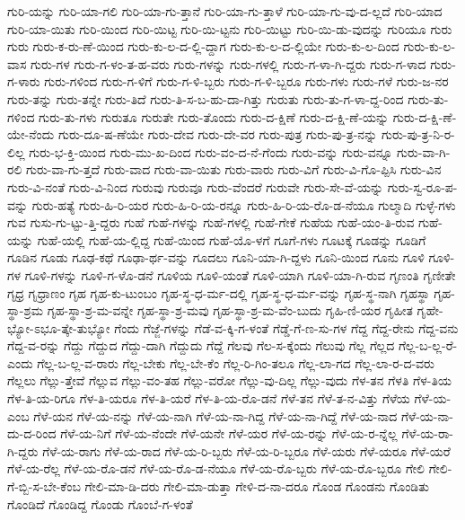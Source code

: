 {ಗುರಿ-ಯನ್ನು
ಗುರಿ-ಯಾ-ಗಲಿ
ಗುರಿ-ಯಾ-ಗು-ತ್ತಾನೆ
ಗುರಿ-ಯಾ-ಗು-ತ್ತಾಳೆ
ಗುರಿ-ಯಾ-ಗು-ವು-ದ-ಲ್ಲದೆ
ಗುರಿ-ಯಾದ
ಗುರಿ-ಯಾ-ಯಿತು
ಗುರಿ-ಯಿಂದ
ಗುರಿ-ಯಿಟ್ಟ
ಗುರಿ-ಯಿ-ಟ್ಟನು
ಗುರಿ-ಯಿಟ್ಟು
ಗುರಿ-ಯಿ-ಡು-ವುದನ್ನು
ಗುರಿಯೂ
ಗುರು
ಗುರು
ಗುರು-ಕ-ರು-ಣೆ-ಯಿಂದ
ಗುರು-ಕು-ಲ-ದ-ಲ್ಲಿ-ದ್ದಾಗ
ಗುರು-ಕು-ಲ-ದ-ಲ್ಲಿಯೇ
ಗುರು-ಕು-ಲ-ದಿಂದ
ಗುರು-ಕು-ಲ-ವಾಸ
ಗುರು-ಗಳ
ಗುರು-ಗ-ಳಂ-ತ-ಹ-ವರು
ಗುರು-ಗಳನ್ನು
ಗುರು-ಗಳಲ್ಲಿ
ಗುರು-ಗ-ಳಾ-ಗಿ-ದ್ದರು
ಗುರು-ಗ-ಳಾದ
ಗುರು-ಗ-ಳಾರು
ಗುರು-ಗಳಿಂದ
ಗುರು-ಗ-ಳಿಗೆ
ಗುರು-ಗ-ಳಿ-ಬ್ಬರು
ಗುರು-ಗ-ಳಿ-ಬ್ಬರೂ
ಗುರು-ಗಳು
ಗುರು-ಗಳೆ
ಗುರು-ಜ-ನರ
ಗುರು-ತನ್ನು
ಗುರು-ತನ್ನೇ
ಗುರು-ತಿದೆ
ಗುರು-ತಿ-ಸ-ಬ-ಹು-ದಾ-ಗಿತ್ತು
ಗುರುತು
ಗುರು-ತು-ಗ-ಳಾ-ದ್ದ-ರಿಂದ
ಗುರು-ತು-ಗಳಿಂದ
ಗುರು-ತು-ಗಳು
ಗುರುತೂ
ಗುರುತೇ
ಗುರು-ತೊಂದು
ಗುರು-ದ-ಕ್ಷಿಣೆ
ಗುರು-ದ-ಕ್ಷಿ-ಣೆ-ಯನ್ನು
ಗುರು-ದ-ಕ್ಷಿ-ಣೆ-ಯೇ-ನೆಂದು
ಗುರು-ದೂ-ಷ-ಣೆಯೇ
ಗುರು-ದೇವ
ಗುರು-ದೇ-ವರ
ಗುರು-ಪುತ್ರ
ಗುರು-ಪು-ತ್ರ-ನನ್ನು
ಗುರು-ಪು-ತ್ರ-ನಿ-ರ-ಲಿಲ್ಲ
ಗುರು-ಭ-ಕ್ತಿ-ಯಿಂದ
ಗುರು-ಮು-ಖ-ದಿಂದ
ಗುರು-ವಂ-ದ-ನೆ-ಗೆಂದು
ಗುರು-ವನ್ನು
ಗುರು-ವನ್ನೂ
ಗುರು-ವಾ-ಗಿ-ರಲಿ
ಗುರು-ವಾ-ಗು-ತ್ತದೆ
ಗುರು-ವಾದ
ಗುರು-ವಾ-ಯಿತು
ಗುರು-ವಾರು
ಗುರು-ವಿಗೆ
ಗುರು-ವಿ-ಗೊ-ಪ್ಪಿಸಿ
ಗುರು-ವಿನ
ಗುರು-ವಿ-ನಂತೆ
ಗುರು-ವಿ-ನಿಂದ
ಗುರುವು
ಗುರುವೂ
ಗುರು-ವೆಂದರೆ
ಗುರುವೇ
ಗುರು-ಸೇ-ವೆ-ಯನ್ನು
ಗುರು-ಸ್ವ-ರೂ-ಪ-ವನ್ನು
ಗುರು-ಹತ್ಯೆ
ಗುರು-ಹಿ-ರಿ-ಯರ
ಗುರು-ಹಿ-ರಿ-ಯ-ರನ್ನೂ
ಗುರು-ಹಿ-ರಿ-ಯ-ರೊ-ಡ-ನೆಯೂ
ಗುಲ್ಮಾದಿ
ಗುಳ್ಳೆ-ಗಳು
ಗುವ
ಗುಸು-ಗು-ಟ್ಟು-ತ್ತಿ-ದ್ದರು
ಗುಹೆ
ಗುಹೆ-ಗಳನ್ನು
ಗುಹೆ-ಗಳಲ್ಲಿ
ಗುಹೆ-ಗೇಕೆ
ಗುಹೆಯ
ಗುಹೆ-ಯಂ-ತಿ-ರುವ
ಗುಹೆ-ಯನ್ನು
ಗುಹೆ-ಯಲ್ಲಿ
ಗುಹೆ-ಯ-ಲ್ಲಿದ್ದ
ಗುಹೆ-ಯಿಂದ
ಗುಹೆ-ಯೊ-ಳಗೆ
ಗೂಗೆ-ಗಳು
ಗೂಟಕ್ಕೆ
ಗೂಡನ್ನು
ಗೂಡಿಗೆ
ಗೂಡಿನ
ಗೂಡು
ಗೂಢ-ಕಥೆ
ಗೂಢಾ-ರ್ಥ-ವನ್ನು
ಗೂದಲು
ಗೂನಿ-ಯಾ-ಗಿ-ದ್ದಳು
ಗೂನಿ-ಯಿಂದ
ಗೂನು
ಗೂಳಿ
ಗೂಳಿ-ಗಳ
ಗೂಳಿ-ಗಳನ್ನು
ಗೂಳಿ-ಗ-ಳೊ-ಡನೆ
ಗೂಳಿಯ
ಗೂಳಿ-ಯಂತೆ
ಗೂಳಿ-ಯಾಗಿ
ಗೂಳಿ-ಯಾ-ಗಿ-ರುವ
ಗೃಣಂತಿ
ಗೃಣೀತೇ
ಗೃಧ್ರ
ಗೃಧ್ರಾಣಂ
ಗೃಹ
ಗೃಹ-ಕು-ಟುಂಬಂ
ಗೃಹ-ಸ್ಥ-ಧ-ರ್ಮ-ದಲ್ಲಿ
ಗೃಹ-ಸ್ಥ-ಧ-ರ್ಮ-ವನ್ನು
ಗೃಹ-ಸ್ಥ-ನಾಗಿ
ಗೃಹಸ್ಥಾ
ಗೃಹ-ಸ್ಥಾ-ಶ್ರಮ
ಗೃಹ-ಸ್ಥಾ-ಶ್ರ-ಮ-ವನ್ನೇ
ಗೃಹ-ಸ್ಥಾ-ಶ್ರ-ಮವು
ಗೃಹ-ಸ್ಥಾ-ಶ್ರ-ಮ-ವೆಂ-ಬುದು
ಗೃಹಿ-ಣಿ-ಯರ
ಗೃಹೀತ
ಗೃಹೇ-ಭ್ಯೋ-ಽಭೂ-ತ್ಕೇ-ತುಭ್ಯೋ
ಗೆಂದು
ಗೆಜ್ಜೆ-ಗಳನ್ನು
ಗೆಡೆ-ವ-ಕ್ಕಿ-ಗ-ಳಂತೆ
ಗೆಡ್ಡೆ-ಗೆ-ಣ-ಸು-ಗಳ
ಗೆದ್ದ
ಗೆದ್ದ-ರೇನು
ಗೆದ್ದ-ವನು
ಗೆದ್ದ-ವ-ರನ್ನು
ಗೆದ್ದು
ಗೆದ್ದುದ
ಗೆದ್ದು-ದಾಗಿ
ಗೆದ್ದುದು
ಗೆದ್ದೆ
ಗೆಲವು
ಗೆಲ-ಸ-ಕ್ಕೆಂದು
ಗೆಲುವು
ಗೆಲ್ಲ
ಗೆಲ್ಲದ
ಗೆಲ್ಲ-ಬ-ಲ್ಲ-ರೆ-ಎಂದು
ಗೆಲ್ಲ-ಬ-ಲ್ಲ-ವ-ರಾರು
ಗೆಲ್ಲ-ಬೇಕು
ಗೆಲ್ಲ-ಬೇ-ಕೆಂ
ಗೆಲ್ಲ-ರಿ-ಗಿಂ-ತಲೂ
ಗೆಲ್ಲ-ಲಾ-ಗದ
ಗೆಲ್ಲ-ಲಾ-ರ-ದ-ವರು
ಗೆಲ್ಲಲು
ಗೆಲ್ಲು-ತ್ತೇವೆ
ಗೆಲ್ಲುವ
ಗೆಲ್ಲು-ವಂ-ತಹ
ಗೆಲ್ಲು-ವರೋ
ಗೆಲ್ಲು-ವು-ದಿಲ್ಲ
ಗೆಲ್ಲು-ವುದು
ಗೆಳ-ತನ
ಗೆಳತಿ
ಗೆಳ-ತಿಯ
ಗೆಳ-ತಿ-ಯ-ರಿಗೂ
ಗೆಳ-ತಿ-ಯರೂ
ಗೆಳ-ತಿ-ಯರೆ
ಗೆಳ-ತಿ-ಯ-ರೊ-ಡನೆ
ಗೆಳೆ-ತನ
ಗೆಳೆ-ತ-ನ-ವಿತ್ತು
ಗೆಳೆಯ
ಗೆಳೆ-ಯ-ಎಂಬ
ಗೆಳೆ-ಯನ
ಗೆಳೆ-ಯ-ನನ್ನು
ಗೆಳೆ-ಯ-ನಾಗಿ
ಗೆಳೆ-ಯ-ನಾ-ಗಿದ್ದ
ಗೆಳೆ-ಯ-ನಾ-ಗಿದ್ದೆ
ಗೆಳೆ-ಯ-ನಾದ
ಗೆಳೆ-ಯ-ನಾ-ದು-ದ-ರಿಂದ
ಗೆಳೆ-ಯ-ನಿಗೆ
ಗೆಳೆ-ಯ-ನೆಂದೇ
ಗೆಳೆ-ಯನೇ
ಗೆಳೆ-ಯರ
ಗೆಳೆ-ಯ-ರನ್ನು
ಗೆಳೆ-ಯ-ರ-ನ್ನೆಲ್ಲ
ಗೆಳೆ-ಯ-ರಾ-ಗಿ-ದ್ದರು
ಗೆಳೆ-ಯ-ರಾಗು
ಗೆಳೆ-ಯ-ರಾದ
ಗೆಳೆ-ಯ-ರಿ-ಬ್ಬರು
ಗೆಳೆ-ಯ-ರಿ-ಬ್ಬರೂ
ಗೆಳೆ-ಯರು
ಗೆಳೆ-ಯರೂ
ಗೆಳೆ-ಯರೆ
ಗೆಳೆ-ಯ-ರೆಲ್ಲ
ಗೆಳೆ-ಯ-ರೊ-ಡನೆ
ಗೆಳೆ-ಯ-ರೊ-ಡ-ನೆಯೂ
ಗೆಳೆ-ಯ-ರೊ-ಬ್ಬರು
ಗೆಳೆ-ಯ-ರೊ-ಬ್ಬರೂ
ಗೇಲಿ
ಗೇಲಿ-ಗೆ-ಬ್ಬಿ-ಸ-ಬೇ-ಕೆಂಬ
ಗೇಲಿ-ಮಾ-ಡಿ-ದರು
ಗೇಲಿ-ಮಾ-ಡುತ್ತಾ
ಗೇಳಿ-ದ-ನಾ-ದರೂ
ಗೊಂಡ
ಗೊಂಡನು
ಗೊಂಡಿತು
ಗೊಂಡಿದೆ
ಗೊಂಡಿದ್ದ
ಗೊಂಡು
ಗೊಂಬೆ-ಗ-ಳಂತೆ
}
